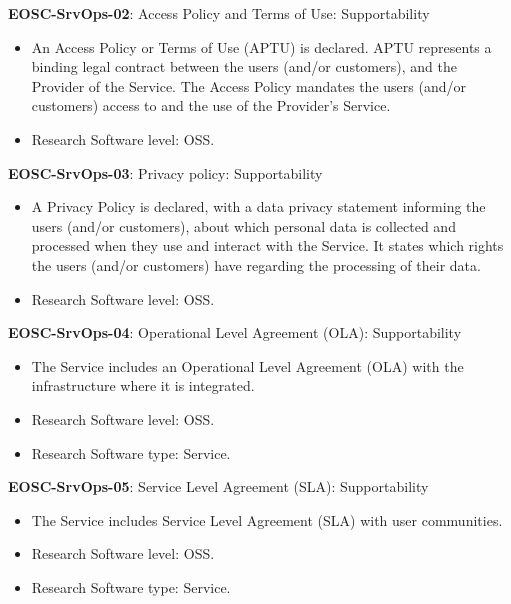 \textbf{EOSC-SrvOps-02}: Access Policy and Terms of Use: Supportability

\begin{itemize}
    \item An Access Policy or Terms of Use (APTU) is declared. APTU represents a binding legal contract between the users (and/or customers), and the Provider of the Service. The Access Policy mandates the users (and/or customers) access to and the use of the Provider's Service. \cite{orviz_fernandez_eosc-synergy_2020}
    \item Research Software level: OSS.
\end{itemize}

\textbf{EOSC-SrvOps-03}: Privacy policy: Supportability

\begin{itemize}
    \item A Privacy Policy is declared, with a data privacy statement informing the users (and/or customers), about which personal data is collected and processed when they use and interact with the Service. It states which rights the users (and/or customers) have regarding the processing of their data. \cite{orviz_fernandez_eosc-synergy_2020}
    \item Research Software level: OSS.
\end{itemize}

\textbf{EOSC-SrvOps-04}: Operational Level Agreement (OLA): Supportability

\begin{itemize}
    \item The Service includes an Operational Level Agreement (OLA) with the infrastructure where it is integrated. \cite{orviz_fernandez_eosc-synergy_2020}
    \item Research Software level: OSS.
    \item Research Software type: Service.
\end{itemize}

\textbf{EOSC-SrvOps-05}: Service Level Agreement (SLA): Supportability

\begin{itemize}
    \item The Service includes Service Level Agreement (SLA) with user communities. \cite{orviz_fernandez_eosc-synergy_2020}
    \item Research Software level: OSS.
    \item Research Software type: Service.
\end{itemize}

